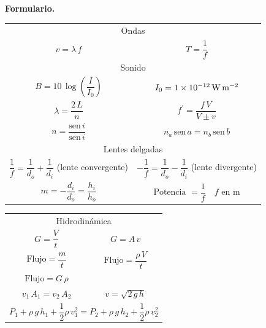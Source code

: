 \documentclass[12pt]{exam}
\begin{document}
\vspace*{1cm}
\textbf{\huge{Formulario.}}
\begin{table}[H]
    \centering
    \setlength{\tabcolsep}{40pt}
    \renewcommand{\arraystretch}{2.5}
    \begin{tabular}{c  c}
        \multicolumn{2}{c}{Ondas} \\
        $v = \lambda \, f$ & $T = \dfrac{1}{f}$ \\ \hline
        \multicolumn{2}{c}{Sonido} \\
        $B = 10 \, \log \left( \dfrac{I}{I_{0}} \right)$ & $I_{0} = \SI{1d-12}{\watt\per\square\meter}$ \\
        $\lambda = \dfrac{2 \, L}{n}$ & $f^{\prime} = \dfrac{f \, V}{V \pm v}$ \\
        $n = \dfrac{\text{sen} \, i}{\text{sen} \, i}$ & $n_{a} \, \text{sen} \,  a = n_{b} \, \text{sen} \,  b$ \\ \hline
        \multicolumn{2}{c}{Lentes delgadas} \\
        $\dfrac{1}{f} = \dfrac{1}{d_{o}} + \dfrac{1}{d_{i}}$ (lente convergente) & $- \dfrac{1}{f} = \dfrac{1}{d_{o}} - \dfrac{1}{d_{i}}$ (lente divergente) \\
        $m = - \dfrac{d_{i}}{d_{o}} = \dfrac{h_{i}}{h_{o}}$ & $\text{Potencia } = \dfrac{1}{f} \quad f \text{ en } \unit{\meter}$ \\ \hline
    \end{tabular}
\end{table}%

\vspace*{-0.5cm}
\begin{table}[H]
    \centering
    \setlength{\tabcolsep}{40pt}
    \renewcommand{\arraystretch}{2.5}
    \begin{tabular}{c  c}
        \multicolumn{2}{c}{Hidrodinámica} \\
        $G = \dfrac{V}{t}$ & $G = A \, v$ \\
        $\text{Flujo} = \dfrac{m}{t}$ & $\text{Flujo} = \dfrac{\rho \, V}{t}$ \\
        $\text{Flujo} = G \, \rho$ & \\
        $v_{1} \, A_{1} = v_{2} \, A_{2}$ & $v = \sqrt{2 \, g \, h}$ \\
        \multicolumn{2}{c}{$P_{1} + \rho \, g \, h_{1} + \dfrac{1}{2} \rho \, v_{1}^{2} = P_{2} + \rho \, g \, h_{2} + \dfrac{1}{2} \rho \, v_{2}^{2}$}
    \end{tabular}
\end{table}
    
\end{document}

